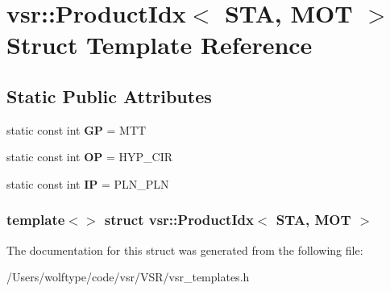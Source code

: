 \hypertarget{structvsr_1_1_product_idx_3_01_s_t_a_00_01_m_o_t_01_4}{\section{vsr\-:\-:Product\-Idx$<$ S\-T\-A, M\-O\-T $>$ Struct Template Reference}
\label{structvsr_1_1_product_idx_3_01_s_t_a_00_01_m_o_t_01_4}
}
\subsection*{Static Public Attributes}
\begin{DoxyCompactItemize}
\item 
\hypertarget{structvsr_1_1_product_idx_3_01_s_t_a_00_01_m_o_t_01_4_aaa7cf8d21ebf370d69b7b924f1b107b1}{static const int {\bfseries G\-P} = M\-T\-T}\label{structvsr_1_1_product_idx_3_01_s_t_a_00_01_m_o_t_01_4_aaa7cf8d21ebf370d69b7b924f1b107b1}

\item 
\hypertarget{structvsr_1_1_product_idx_3_01_s_t_a_00_01_m_o_t_01_4_a877ebcaad882c9444748d815d0fa2982}{static const int {\bfseries O\-P} = H\-Y\-P\-\_\-\-C\-I\-R}\label{structvsr_1_1_product_idx_3_01_s_t_a_00_01_m_o_t_01_4_a877ebcaad882c9444748d815d0fa2982}

\item 
\hypertarget{structvsr_1_1_product_idx_3_01_s_t_a_00_01_m_o_t_01_4_ae7a63beba002bcb9d1a579282b6e50e7}{static const int {\bfseries I\-P} = P\-L\-N\-\_\-\-P\-L\-N}\label{structvsr_1_1_product_idx_3_01_s_t_a_00_01_m_o_t_01_4_ae7a63beba002bcb9d1a579282b6e50e7}

\end{DoxyCompactItemize}
\subsubsection*{template$<$$>$ struct vsr\-::\-Product\-Idx$<$ S\-T\-A, M\-O\-T $>$}



The documentation for this struct was generated from the following file\-:\begin{DoxyCompactItemize}
\item 
/\-Users/wolftype/code/vsr/\-V\-S\-R/vsr\-\_\-templates.\-h\end{DoxyCompactItemize}
